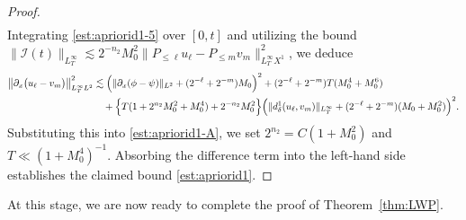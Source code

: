 \documentclass{amsart}
\numberwithin{equation}{section}
\begin{document}
\begin{proof}
\begin{equation}
\begin{aligned}
\end{aligned} 
\end{equation}
Integrating \eqref{est:apriorid1-5} over $[0, t]$ and utilizing the bound $\| \mathcal{I}(t)\|_{L^\infty_T}\lesssim 2^{-n_2}M_0^2\| P_{\leq \ell}u_\ell-P_{\leq m}v_m\|_{L^\infty_TX^1}^2$, we deduce
\begin{align}\label{est:apriorid1-B}
\big\| \partial_x\big( u_\ell-v_m\big) \big\|_{L^\infty_TL^2}^2
&\lesssim \Big( \|\partial_x(\phi-\psi)\|_{L^2}+(2^{-\ell}+2^{-m})M_0\Big) ^2 + (2^{-\ell}+2^{-m})T(M_0^4+M_0^6) \\
&\quad +\Big\{ T(1+2^{n_2}M_0^2+M_0^4) + 2^{-n_2}M_0^2\Big\} \Big( \| d^1_\delta(u_\ell,v_m)\|_{L^\infty_T}+(2^{-\ell}+2^{-m})(M_0+M_0^2)\Big)^2.\notag
\end{align}
Substituting this into \eqref{est:apriorid1-A}, we set $2^{n_2}=C(1+M_0^2)$ and $T \ll (1+M_0^4)^{-1}$. 
Absorbing the difference term into the left-hand side establishes the claimed bound \eqref{est:apriorid1}.
\end{proof}




\medskip
At this stage, we are now ready to complete the proof of Theorem~\ref{thm:LWP}.
\end{document}

